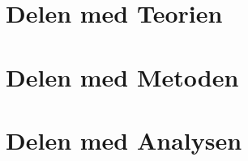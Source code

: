% 





\tableofcontents*		%

\newpage

\thispagestyle{empty}
 
\listoffigures
\listoftables
 
\newpage







	\part{Delen med Teorien \label{part_teori}}

 		

	\part{Delen med Metoden \label{part_metode}}
		 
	 	

	\part{Delen med Analysen \label{part_analyse}}


